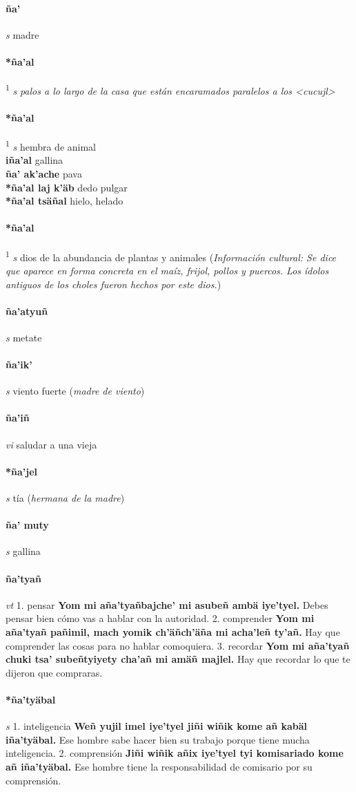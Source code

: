 \documentclass{scrbook}
\newcommand{\entry}[1]{\paragraph{#1}}
\newcommand{\onedefinition}[1]{#1.}
\newcommand{\defsuperscript}[1]{\textsuperscript{1}}
\newcommand{\nontranslationdef}[1]{\textit{#1}}
\newcommand{\partofspeech}[1]{\textit{#1}}
\newcommand{\spanishtranslation}[1]{#1}
\newcommand{\clarification}[1]{(\textit{#1})}
\newcommand{\cholexample}[1]{\textbf{#1}}
\newcommand{\exampletranslation}[1]{#1}
\newcommand{\culturalinformation}[1]{(\textit{#1})}
\newcommand{\secondaryentry}[1]{\\\textbf{#1}}
\newcommand{\secondtranslation}[1]{#1}
\begin{document}
\begin{multicols}{2}
\entry{ña'}
\partofspeech{s}
\spanishtranslation{madre}

\entry{*ña'al}
\defsuperscript{1}
\partofspeech{s}
\nontranslationdef{palos a lo largo de la casa que están encaramados paralelos a los <cucujl>}

\entry{*ña'al}
\defsuperscript{2}
\partofspeech{s}
\spanishtranslation{hembra de animal}
\secondaryentry{iña'al}
\secondtranslation{gallina}
\secondaryentry{ña' ak'ache}
\secondtranslation{pava}
\secondaryentry{*ña'al laj k'äb}
\secondtranslation{dedo pulgar}
\secondaryentry{*ña'al tsäñal}
\secondtranslation{hielo, helado}

\entry{*ña'al}
\defsuperscript{3}
\partofspeech{s}
\spanishtranslation{dios de la abundancia de plantas y animales}
\culturalinformation{Información cultural: Se dice que aparece en forma concreta en el maíz, frijol, pollos y puercos. Los ídolos antiguos de los choles fueron hechos por este dios.}

\entry{ña'atyuñ}
\partofspeech{s}
\spanishtranslation{metate}

\entry{ña'ik'}
\partofspeech{s}
\spanishtranslation{viento fuerte}
\clarification{madre de viento}

\entry{ña'iñ}
\partofspeech{vi}
\spanishtranslation{saludar a una vieja}

\entry{*ña'jel}
\partofspeech{s}
\spanishtranslation{tía}
\clarification{hermana de la madre}

\entry{ña' muty}
\partofspeech{s}
\spanishtranslation{gallina}

\entry{ña'tyañ}
\partofspeech{vt}
\onedefinition{1}
\spanishtranslation{pensar}
\cholexample{Yom mi aña'tyañbajche' mi asubeñ ambä iye'tyel.}
\exampletranslation{Debes pensar bien cómo vas a hablar con la autoridad.}
\onedefinition{2}
\spanishtranslation{comprender}
\cholexample{Yom mi aña'tyañ pañimil, mach yomik ch'äñch'äña mi acha'leñ ty'añ.}
\exampletranslation{Hay que comprender las cosas para no hablar comoquiera.}
\onedefinition{3}
\spanishtranslation{recordar}
\cholexample{Yom mi aña'tyañ chuki tsa' subeñtyiyety cha'añ mi amäñ majlel.}
\exampletranslation{Hay que recordar lo que te dijeron que compraras.}

\entry{*ña'tyäbal}
\partofspeech{s}
\onedefinition{1}
\spanishtranslation{inteligencia}
\cholexample{Weñ yujil imel iye'tyel jiñi wiñik kome añ kabäl iña'tyäbal.}
\exampletranslation{Ese hombre sabe hacer bien su trabajo porque tiene mucha inteligencia.}
\onedefinition{2}
\spanishtranslation{comprensión}
\cholexample{Jiñi wiñik añix iye'tyel tyi komisariado kome añ iña'tyäbal.}
\exampletranslation{Ese hombre tiene la responsabilidad de comisario por su comprensión.}


\end{multicols}
\end{document}
